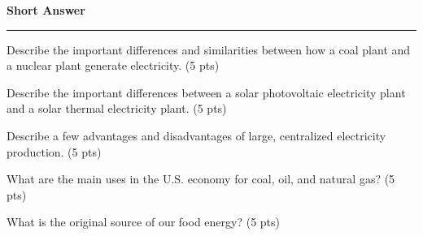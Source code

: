 \documentclass[12pt, oneside]{article}
\newif\ifsolution
\newcommand{\chead}[1]
{\begin{center}\large\textbf{#1}\end{center}
\hrule
\vspace{10pt}}
\newcommand{\solution}[1]
{\ifsolution
Answer: {\it #1}
\else\fi}
\begin{document}
\vfill

\newpage
\chead{Short Answer}

Describe the important differences and similarities between how a coal
plant and a nuclear plant generate electricity. (5 pts)

\solution{Differences: The main difference is in the source of heat.  A
coal plant uses combustion of coal while a nuclear plant uses a chain
reaction of nuclear fission to create heat.

Similarities: The main
similarity is in the use of steam turbines to generate electricity
through a steam heat engine.}

\vfill

Describe the important differences between a solar photovoltaic
electricity plant and a solar thermal electricity plant. (5 pts)

\solution{Solar PV electricity creates direct current electricity
without a  thermal cycle while solar thermal electricity uses technology
Rankine cycle steam turbines to generate AC electricity.}

\vfill

Describe a few advantages and disadvantages of large, centralized
electricity production. (5 pts)

\solution{Advantages include economies of scale that make larger plants
more cost effective.  Disadvantages include large investments, large
effect from individual plant failures, and
transmission costs.}

\vfill

What are the main uses in the U.S. economy for coal, oil, and natural gas? (5 pts)

\solution{Coal is mostly used for electricity production, oil is mostly
used for transportation, natural gas has many uses including
electricity, heating, and transportation.}

\vfill

What is the original source of our food energy? (5 pts)

\solution{The chemical energy in our food was originally radiation
energy from the sun which was converted to chemical energy by plants.
Depending on your diet, you may also consume organisms that consumed
plants.  Bonus if you mention the nuclear energy from the sun.}
\end{document}
